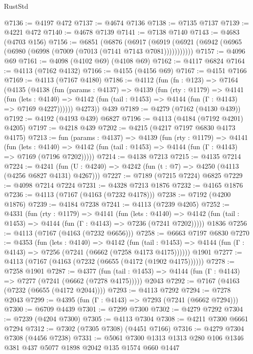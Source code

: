 \begin{lexlean}{RustStd}
\begin{coremodule}
@7136 := @4197 @472
@7137 := @4674 @7136
@7138 := @7135 @7137
@7139 := @4221 @472
@7140 := @4678 @7139
@7141 := @7138 @7140
@7143 := @4683 (@4703 @156)
@7156 := @6851
    (@6876
      (@6917 (@6919 (@6921 (@6942 (@6965 (@6980 (@6998 (@7009 (@7013 (@7141 @7143 @7081)))))))))))
@7157 := @4096 @69
@7161 := @4098 (@4102 @69) (@4108 @69)
@7162 := @4117 @6824
@7164 := @4113 (@7162 @4132)
@7166 := @4155 (@4156 @69)
@7167 := @4151 @7166
@7169 := @4113 (@7167 @4180)
@7186 := @4112
    (fun (fn : @123) =>
    @7164
      (@4135
        (@4138
          (fun (params : @4137) =>
          @4139
            (fun (rty : @1179) =>
            @4141
              (fun (lets : @4140) =>
              @4142 (fun (tail : @1453) => @4144 (fun (Γ : @4143) => @7169 @4227))))))
        @4273))
    @439
@7189 := @4279 (@7162 (@4130 @439))
@7192 := @4192 (@4193 @439) @6827
@7196 := @4113 (@4184 (@7192 @4201) @4205)
@7197 := @4218 @439
@7202 := @4215 (@4217 @7197 @6830 @4173 @4175)
@7213 := fun (params : @4137) =>
  @4139
    (fun (rty : @1179) =>
    @4141
      (fun (lets : @4140) =>
      @4142 (fun (tail : @1453) => @4144 (fun (Γ : @4143) => @7169 (@7196 @7202)))))
@7214 := @4138 @7213
@7215 := @4135 @7214
@7224 := @4241 (fun (U : @4240) => @4242 (fun (t : @7) => @4250 (@4113 (@4256 @6827 @4131) @4267)))
@7227 := @7189 (@7215 @7224) @6825
@7229 := @4098 @7214 @7224
@7231 := @4328 @7213 @1876
@7232 := @4165 @1876
@7236 := @4113 (@7167 (@4163 (@7232 @4178)))
@7238 := @7192 (@4200 @1876)
@7239 := @4184 @7238
@7241 := @4113 (@7239 @4205)
@7252 := @4331
    (fun (rty : @1179) =>
    @4141
      (fun (lets : @4140) =>
      @4142 (fun (tail : @1453) => @4144 (fun (Γ : @4143) => @7236 (@7241 @7202)))))
    @1836
@7256 := @4113 (@7167 (@4163 (@7232 @6656)))
@7258 := @6663 @7197 @6830
@7270 := @4353
    (fun (lets : @4140) =>
    @4142
      (fun (tail : @1453) => @4144 (fun (Γ : @4143) => @7256 (@7241 (@6662 (@7258 @4173 @4175))))))
    @1901
@7277 := @4113 (@7167 (@4163 (@7232 (@6655 (@4172 (@1902 @4175))))))
@7278 := @7258 @1901
@7287 := @4377
    (fun (tail : @1453) => @4144 (fun (Γ : @4143) => @7277 (@7241 (@6662 (@7278 @4175)))))
    @2043
@7292 := @7167 (@4163 (@7232 (@6655 (@4172 @2044))))
@7293 := @4113 @7292
@7294 := @7278 @2043
@7299 := @4395 (fun (Γ : @4143) => @7293 (@7241 (@6662 @7294)))
@7300 := @6709 @4439
@7301 := @7299 @7300
@7302 := @4279 @7292
@7304 := @7239 (@4204 @7300)
@7305 := @4113 @7304
@7308 := @4211 @7300 @6661 @7294
@7312 := @7302 (@7305 @7308) (@4451 @7166)
@7316 := @4279 @7304 @7308 (@4456 @7238)
@7331 := @5061 @7300 @1313 @1313 @280 @106 @1346 @381 @437 @5077 @1898 @2042 @135 @1574 @660 @1447

\end{coremodule}
\end{lexlean}
